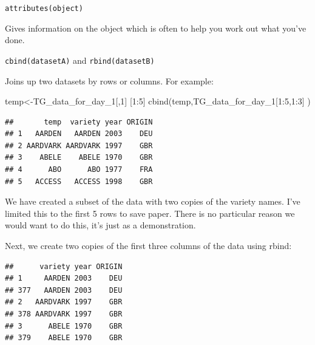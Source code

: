 \documentclass[
]{book}
\newenvironment{Shaded}{\begin{snugshade}}{\end{snugshade}}
\newcommand{\DecValTok}[1]{\textcolor[rgb]{0.00,0.00,0.81}{#1}}
\newcommand{\FunctionTok}[1]{\textcolor[rgb]{0.00,0.00,0.00}{#1}}
\newcommand{\NormalTok}[1]{#1}
\newcommand{\OtherTok}[1]{\textcolor[rgb]{0.56,0.35,0.01}{#1}}
\newcommand{\SpecialCharTok}[1]{\textcolor[rgb]{0.00,0.00,0.00}{#1}}
\begin{document}
\texttt{attributes(object)}

Gives information on the object which is often to help you work out what you've done.

\texttt{cbind(datasetA)} and \texttt{rbind(datasetB)}

Joins up two datasets by rows or columns. For example:

\begin{Shaded}
\begin{Highlighting}[]
\NormalTok{temp}\OtherTok{\textless{}{-}}\NormalTok{TG\_data\_for\_day\_1[,}\DecValTok{1}\NormalTok{] [}\DecValTok{1}\SpecialCharTok{:}\DecValTok{5}\NormalTok{]}
\FunctionTok{cbind}\NormalTok{(temp,TG\_data\_for\_day\_1[}\DecValTok{1}\SpecialCharTok{:}\DecValTok{5}\NormalTok{,}\DecValTok{1}\SpecialCharTok{:}\DecValTok{3}\NormalTok{]  )}
\end{Highlighting}
\end{Shaded}

\begin{verbatim}
##       temp  variety year ORIGIN
## 1   AARDEN   AARDEN 2003    DEU
## 2 AARDVARK AARDVARK 1997    GBR
## 3    ABELE    ABELE 1970    GBR
## 4      ABO      ABO 1977    FRA
## 5   ACCESS   ACCESS 1998    GBR
\end{verbatim}

We have created a subset of the data with two copies of the variety names. I've limited this to the first 5 rows to save paper. There is no particular reason we would want to do this, it's just as a demonstration.

Next, we create two copies of the first three columns of the data using rbind:

\begin{Shaded}
\end{Shaded}

\begin{verbatim}
##      variety year ORIGIN
## 1     AARDEN 2003    DEU
## 377   AARDEN 2003    DEU
## 2   AARDVARK 1997    GBR
## 378 AARDVARK 1997    GBR
## 3      ABELE 1970    GBR
## 379    ABELE 1970    GBR
\end{verbatim}
\end{document}
